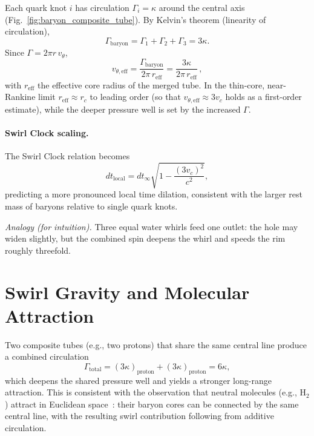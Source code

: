 \documentclass[11pt]{article}
\begin{document}
    Each quark knot $i$ has circulation $\Gamma_i = \kappa$ around the central axis (Fig.~\ref{fig:baryon_composite_tube}).
    By Kelvin’s theorem (linearity of circulation),
        \begin{equation}
            \Gamma_{\mathrm{baryon}}=\Gamma_1+\Gamma_2+\Gamma_3=3\kappa.
        \end{equation}
        Since $\Gamma=2\pi r\,v_\theta$,
        \begin{equation}
            \boxed{\;
            v_{\theta,\mathrm{eff}}=\frac{\Gamma_{\mathrm{baryon}}}{2\pi\,r_{\mathrm{eff}}}
                =\frac{3\kappa}{2\pi\,r_{\mathrm{eff}}}\,,
                \;}\label{eq:baryon-vtheta}
        \end{equation}
        with $r_{\mathrm{eff}}$ the effective core radius of the merged tube. In the thin-core, near-Rankine limit $r_{\mathrm{eff}}\approx r_c$ to leading order (so that $v_{\theta,\mathrm{eff}}\approx 3 v_c$ holds as a first-order estimate), while the deeper pressure well is set by the increased $\Gamma$.

        \paragraph{Swirl Clock scaling.}
        The Swirl Clock relation becomes
        \begin{equation}
            dt_{\mathrm{local}} = dt_\infty \sqrt{1 - \frac{(3 v_c)^2}{c^2}},\label{eq:baryon-swirl-clock}
        \end{equation}
        predicting a more pronounced local time dilation, consistent with the larger rest mass of baryons relative to single quark knots.

            \emph{Analogy (for intuition).} Three equal water whirls feed one outlet: the hole may widen slightly, but the combined spin deepens the whirl and speeds the rim roughly threefold.





\section{Swirl Gravity and Molecular Attraction}
    Two composite tubes (e.g., two protons) that share the same central line produce a combined circulation
    \[
        \Gamma_{\mathrm{total}} = (3 \kappa)_{\mathrm{proton}} + (3 \kappa)_{\mathrm{proton}} = 6 \kappa,
    \]
    which deepens the shared pressure well and yields a stronger long-range attraction.
    This is consistent with the observation that neutral molecules (e.g., H$_2$) attract in Euclidean space~\cite{london1930,casimirpolder1948}: their baryon cores can be connected by the same central line, with the resulting swirl contribution following from additive circulation.
\end{document}
